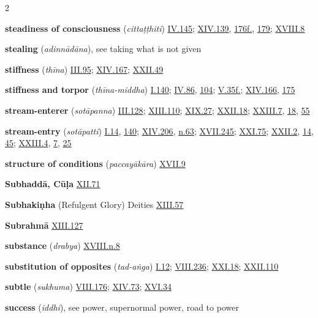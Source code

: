 \begin{multicols}{2}
\begin{vismHanging}
\par\textbf{steadiness of consciousness} (\emph{cittaṭṭhiti}) \hyperlink{IV.145}{IV.145}{}; \hyperlink{XIV.139}{XIV.139}{}, \hyperlink{XIV.176}{176f.}{}, \hyperlink{XIV.179}{179}{}; \hyperlink{XVIII.8}{XVIII.8}{}
\par\textbf{stealing} (\emph{adinnādāna}), see taking what is not given 
\par\textbf{stiffness} (\emph{thīna}) \hyperlink{III.95}{III.95}{}; \hyperlink{XIV.167}{XIV.167}{}; \hyperlink{XXII.49}{XXII.49}{}
\par\textbf{stiffness and torpor} (\emph{thīna-middha}) \hyperlink{I.140}{I.140}{}; \hyperlink{IV.86}{IV.86}{}, \hyperlink{IV.104}{104}{}; \hyperlink{V.35}{V.35f.}{}; \hyperlink{XIV.166}{XIV.166}{}, \hyperlink{XIV.175}{175}{}
\par\textbf{stream-enterer} (\emph{sotāpanna}) \hyperlink{III.128}{III.128}{}; \hyperlink{XIII.110}{XIII.110}{}; \hyperlink{XIX.27}{XIX.27}{}; \hyperlink{XXII.18}{XXII.18}{}; \hyperlink{XXIII.7}{XXIII.7}{}, \hyperlink{XXIII.18}{18}{}, \hyperlink{XXIII.55}{55}{}
\par\textbf{stream-entry} (\emph{sotāpatti}) \hyperlink{I.14}{I.14}{}, \hyperlink{I.140}{140}{}; \hyperlink{XIV.206}{XIV.206}{}, \hyperlink{XIV.n63}{n.63}{}; \hyperlink{XVII.245}{XVII.245}{}; \hyperlink{XXI.75}{XXI.75}{}; \hyperlink{XXII.2}{XXII.2}{}, \hyperlink{XXII.14}{14}{}, \hyperlink{XXII.45}{45}{}; \hyperlink{XXIII.4}{XXIII.4}{}, \hyperlink{XXIII.7}{7}{}, \hyperlink{XXIII.25}{25}{}
\par\textbf{structure of conditions} (\emph{paccayākāra}) \hyperlink{XVII.9}{XVII.9}{}
\par\textbf{Subhaddā, Cūḷa} \hyperlink{XII.71}{XII.71}{}
\par\textbf{Subhakiṇha} (Refulgent Glory) Deities \hyperlink{XIII.57}{XIII.57}{}
\par\textbf{Subrahmā} \hyperlink{XIII.127}{XIII.127}{}
\par\textbf{substance} (\emph{drabya}) \hyperlink{XVIII.n8}{XVIII.n.8}{}
\par\textbf{substitution of opposites} (\emph{tad-aṅga}) \hyperlink{I.12}{I.12}{}; \hyperlink{VIII.236}{VIII.236}{}; \hyperlink{XXI.18}{XXI.18}{}; \hyperlink{XXII.110}{XXII.110}{}
\par\textbf{subtle} (\emph{sukhuma}) \hyperlink{VIII.176}{VIII.176}{}; \hyperlink{XIV.73}{XIV.73}{}; \hyperlink{XVI.34}{XVI.34}{}
\par\textbf{success} (\emph{iddhi}), see power, supernormal power, road to power 

\end{vismHanging}
\end{multicols}
